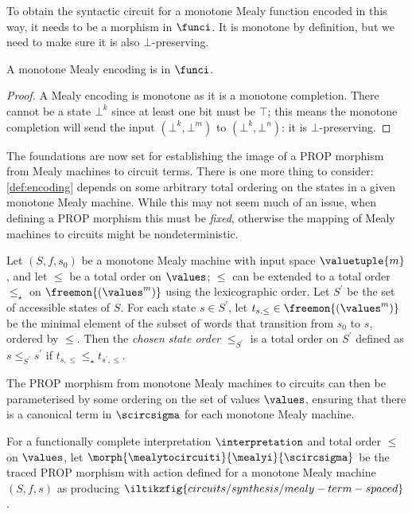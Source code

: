 To obtain the syntactic circuit for a monotone Mealy function encoded
in this way, it needs to be a morphism in \(\funci\).
It is monotone by definition, but we need to make sure it is also
\(\bot\)-preserving.

\begin{lemma}
    A monotone Mealy encoding is in \(\funci\).
\end{lemma}
\begin{proof}
    A Mealy encoding is monotone as it is a monotone completion.
    There cannot be a state \(\bot^k\) since at least one bit must
    be \(\top\); this means the monotone completion will send the input
    \((\bot^k, \bot^m)\) to \((\bot^k, \bot^n)\): it is
    \(\bot\)-preserving.
\end{proof}

The foundations are now set for establishing the image of a PROP morphism from
Mealy machines to circuit terms.
There is one more thing to consider: \cref{def:encoding} depends on some
arbitrary total ordering on the states in a given monotone Mealy machine.
While this may not seem much of an issue, when
defining a PROP morphism this must be \emph{fixed}, otherwise the mapping of
Mealy machines to circuits might be nondeterministic.

\begin{definition}
    Let \((S, f, s_0)\) be a monotone Mealy machine with input space
    \(\valuetuple{m}\), and let \(\leq\) be a total order on \(\values\);
    \(\leq\) can be extended to a total order \(\leq_\star\) on
    \(\freemon{(\values^m)}\) using the lexicographic order.
    Let \(S^\prime\) be the set of accessible states of \(S\).
    For each state \(s \in S^\prime\), let
    \(t_{s,\leq} \in \freemon{(\values^m)}\) be the minimal element of the
    subset of words that transition from \(s_0\) to \(s\), ordered by \(\leq\).
    Then the \emph{chosen state order} \(\leq_{S^\prime}\) is a total order on
    \(S^\prime\) defined as \(s \leq_{S^\prime} s^\prime\) if
    \(t_{s,\leq} \leq_\star t_{s^\prime,\leq}\).
\end{definition}

The PROP morphism from monotone Mealy machines to circuits can then be
parameterised by some ordering on the set of values \(\values\), ensuring that
there is a canonical term in \(\scircsigma\) for each monotone Mealy machine.

\begin{definition}\label{def:mealy-to-circuit}
    For a functionally complete interpretation \(\interpretation\) and total
    order \(\leq\) on \(\values\), let \(
    \morph{
        \mealytocircuiti
    }{
        \mealyi
    }{
        \scircsigma
    }
    \) be the traced PROP morphism with action defined for a monotone Mealy
    machine \((S,f,s)\) as producing \(
    \iltikzfig{circuits/synthesis/mealy-term-spaced}
    \).
\end{definition}


